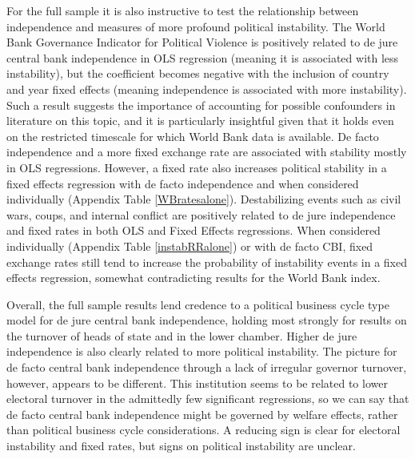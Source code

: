 \documentclass{article}
\begin{document}
    For the full sample it is also instructive to test the relationship between independence and measures of more profound political instability. The World Bank Governance Indicator for Political Violence is positively related to de jure central bank independence in OLS regression (meaning it is associated with less instability), but the coefficient becomes negative with the inclusion of country and year fixed effects (meaning independence is associated with more instability). Such a result suggests the importance of accounting for possible confounders in literature on this topic, and it is particularly insightful given that it holds even on the restricted timescale for which World Bank data is available. De facto independence and a more fixed exchange rate are associated with stability mostly in OLS regressions. However, a fixed rate also increases political stability in a fixed effects regression with de facto independence and when considered individually (Appendix Table \ref*{WBratesalone}). Destabilizing events such as civil wars, coups, and internal conflict are positively related to de jure independence and fixed rates in both OLS and Fixed Effects regressions. When considered individually (Appendix Table \ref*{instabRRalone}) or with de facto CBI, fixed exchange rates still tend to increase the probability of instability events in a fixed effects regression, somewhat contradicting results for the World Bank index.

    Overall, the full sample results lend credence to a political business cycle type model for de jure central bank independence, holding most strongly for results on the turnover of heads of state and in the lower chamber. Higher de jure independence is also clearly related to more political instability. The picture for de facto central bank independence through a lack of irregular governor turnover, however, appears to be different. This institution seems to be related to lower electoral turnover in the admittedly few significant regressions, so we can say that de facto central bank independence might be governed by welfare effects, rather than political business cycle considerations. A reducing sign is clear for electoral instability and fixed rates, but signs on political instability are unclear.
    
\end{document}
